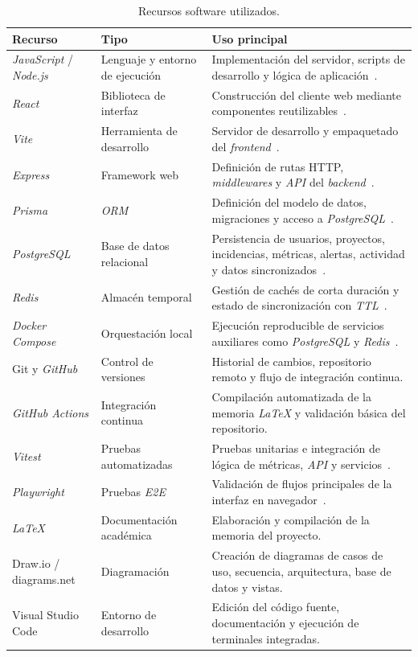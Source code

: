 \begin{table}[htbp]
\centering
\small
\begin{tabularx}{\textwidth}{p{} p{} X}
\toprule
\textbf{Recurso} & \textbf{Tipo} & \textbf{Uso principal} \\
\midrule
\textit{JavaScript} / \textit{Node.js} & Lenguaje y entorno de ejecución & Implementación del servidor, scripts de desarrollo y lógica de aplicación~\cite{NodeDocs}. \\
\midrule
\textit{React} & Biblioteca de interfaz & Construcción del cliente web mediante componentes reutilizables~\cite{ReactDocs}. \\
\midrule
\textit{Vite} & Herramienta de desarrollo & Servidor de desarrollo y empaquetado del \textit{frontend}~\cite{ViteDocs}. \\
\midrule
\textit{Express} & Framework web & Definición de rutas HTTP, \textit{middlewares} y \textit{API} del \textit{backend}~\cite{ExpressDocs}. \\
\midrule
\textit{Prisma} & \textit{ORM} & Definición del modelo de datos, migraciones y acceso a \textit{PostgreSQL}~\cite{PrismaDocs}. \\
\midrule
\textit{PostgreSQL} & Base de datos relacional & Persistencia de usuarios, proyectos, incidencias, métricas, alertas, actividad y datos sincronizados~\cite{PostgreSQLDocs}. \\
\midrule
\textit{Redis} & Almacén temporal & Gestión de cachés de corta duración y estado de sincronización con \textit{TTL}~\cite{RedisDocs}. \\
\midrule
\textit{Docker Compose} & Orquestación local & Ejecución reproducible de servicios auxiliares como \textit{PostgreSQL} y \textit{Redis}~\cite{DockerComposeDocs}. \\
\midrule
Git y \textit{GitHub} & Control de versiones & Historial de cambios, repositorio remoto y flujo de integración continua. \\
\midrule
\textit{GitHub Actions} & Integración continua & Compilación automatizada de la memoria \textit{LaTeX} y validación básica del repositorio. \\
\midrule
\textit{Vitest} & Pruebas automatizadas & Pruebas unitarias e integración de lógica de métricas, \textit{API} y servicios~\cite{VitestGuide}. \\
\midrule
\textit{Playwright} & Pruebas \textit{E2E} & Validación de flujos principales de la interfaz en navegador~\cite{PlaywrightDocs}. \\
\midrule
\textit{LaTeX} & Documentación académica & Elaboración y compilación de la memoria del proyecto. \\
\midrule
Draw.io / diagrams.net & Diagramación & Creación de diagramas de casos de uso, secuencia, arquitectura, base de datos y vistas. \\
\midrule
Visual Studio Code & Entorno de desarrollo & Edición del código fuente, documentación y ejecución de terminales integradas. \\
\bottomrule
\end{tabularx}
\caption{Recursos software utilizados.}
\label{tab:recursosSoftware}
\end{table}

